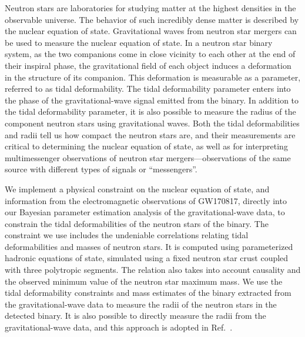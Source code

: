 Neutron stars are laboratories for studying matter at the highest densities in the observable universe. The behavior of such incredibly dense matter is described by the nuclear equation of state. Gravitational waves from neutron star mergers can be used to measure the nuclear equation of state. In a neutron star binary system, as the two companions come in close vicinity to each other at the end of their inspiral phase, the gravitational field of each object induces a deformation in the structure of its companion. This deformation is measurable as a parameter, referred to as tidal deformability. The tidal deformability parameter enters into the phase of the gravitational-wave signal emitted from the binary. In addition to the tidal deformability parameter, it is also possible to measure the radius of the component neutron stars using gravitational waves. Both the tidal deformabilities and radii tell us how compact the neutron stars are, and their measurements are critical to determining the nuclear equation of state, as well as for interpreting multimessenger observations of neutron star mergers---observations of the same source with different types of signals or ``messengers''.

We implement a physical constraint on the nuclear equation of state, and information from the electromagnetic observations of GW170817, directly into our Bayesian parameter estimation analysis of the gravitational-wave data, to constrain the tidal deformabilities of the neutron stars of the binary. The constraint we use includes the undeniable correlations relating tidal deformabilities and masses of neutron stars. It is computed using parameterized hadronic equations of state, simulated using a fixed neutron star crust coupled with three polytropic segments. The relation also takes into account causality and the observed minimum value of the neutron star maximum mass. We use the tidal deformability constraints and mass estimates of the binary extracted from the gravitational-wave data to measure the radii of the neutron stars in the detected binary. It is also possible to directly measure the radii from the gravitational-wave data, and this approach is adopted in Ref.~\cite{capano_stringent_2020}.

